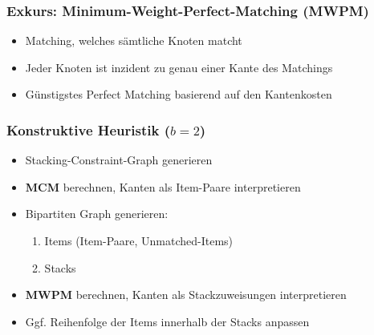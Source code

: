 \documentclass{beamer}
\begin{document}
\begin{frame}
\frametitle{Exkurs: Minimum-Weight-Perfect-Matching (\textsc{MWPM})}
\begin{itemize}
  \item Matching, welches sämtliche Knoten matcht
  \item Jeder Knoten ist inzident zu genau einer Kante des Matchings
  \item Günstigstes Perfect Matching basierend auf den Kantenkosten
\end{itemize}
\begin{figure}[H]
\centering
{}
\end{figure}
\end{frame}

\begin{frame}
\frametitle{Konstruktive Heuristik ($b = 2$)}

\begin{itemize}
  \item Stacking-Constraint-Graph generieren
  \item \textsc{\textbf{MCM}} berechnen, Kanten als Item-Paare interpretieren
  \item Bipartiten Graph generieren:
  \begin{enumerate}
    \item Items (Item-Paare, Unmatched-Items)
    \item Stacks
  \end{enumerate}
  \item \textsc{\textbf{MWPM}} berechnen, Kanten als Stackzuweisungen interpretieren
  \item Ggf. Reihenfolge der Items innerhalb der Stacks anpassen
\end{itemize}
\end{frame}
\end{document}
